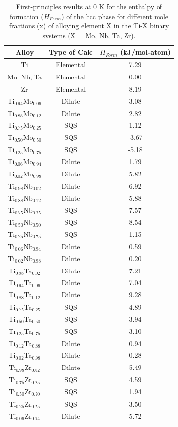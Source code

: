 \newpage
\begin{table}[H]
	\caption{First-principles results at 0 K for the enthalpy of formation ($H_{Form}$) of the bcc phase for different mole fractions (x) of alloying element X in the Ti-X binary systems (X = Mo, Nb, Ta, Zr).}
	\centering
	\begin{tabular}{ c c c }
		\hline
		Alloy & Type of Calc & $H_{Form}$ (kJ/mol-atom)\\
		\hline
		Ti & Elemental & 7.29\\
		Mo, Nb, Ta & Elemental & 0.00\\
		Zr & Elemental & 8.19\\
		Ti$_{0.94}$Mo$_{0.06}$ & Dilute & 3.08\\
		Ti$_{0.88}$Mo$_{0.12}$ & Dilute & 2.82\\
		Ti$_{0.75}$Mo$_{0.25}$ & SQS & 1.12\\
		Ti$_{0.50}$Mo$_{0.50}$ & SQS & -3.67\\
		Ti$_{0.25}$Mo$_{0.75}$ & SQS & -5.18\\
		Ti$_{0.06}$Mo$_{0.94}$ & Dilute & 1.79\\
		Ti$_{0.02}$Mo$_{0.98}$ & Dilute & 5.82\\
		Ti$_{0.98}$Nb$_{0.02}$ & Dilute & 6.92\\
		Ti$_{0.88}$Nb$_{0.12}$ & Dilute & 5.88\\ 
		Ti$_{0.75}$Nb$_{0.25}$ & SQS & 7.57\\
		Ti$_{0.50}$Nb$_{0.50}$ & SQS & 8.54\\
		Ti$_{0.25}$Nb$_{0.75}$ & SQS & 1.15\\
		Ti$_{0.06}$Nb$_{0.94}$ & Dilute & 0.59\\
		Ti$_{0.02}$Nb$_{0.98}$ & Dilute & 0.20\\
		Ti$_{0.98}$Ta$_{0.02}$ & Dilute & 7.21\\
		Ti$_{0.94}$Ta$_{0.06}$ & Dilute & 7.04\\
		Ti$_{0.88}$Ta$_{0.12}$ & Dilute & 9.28\\
		Ti$_{0.75}$Ta$_{0.25}$ & SQS & 4.89\\
		Ti$_{0.50}$Ta$_{0.50}$ & SQS & 3.94\\
		Ti$_{0.25}$Ta$_{0.75}$ & SQS & 3.10\\
		Ti$_{0.12}$Ta$_{0.88}$ & Dilute & 0.94\\
		Ti$_{0.02}$Ta$_{0.98}$ & Dilute & 0.28\\
		Ti$_{0.98}$Zr$_{0.02}$ & Dilute & 5.49\\
		Ti$_{0.75}$Zr$_{0.25}$ & SQS & 4.59\\
		Ti$_{0.50}$Zr$_{0.50}$ & SQS & 1.94\\
		Ti$_{0.25}$Zr$_{0.75}$ & SQS & 3.50\\
		Ti$_{0.06}$Zr$_{0.94}$ & Dilute & 5.72\\
		\hline
	\end{tabular}
    \label{Ch3-table:binaryhform}
\end{table}
\clearpage

